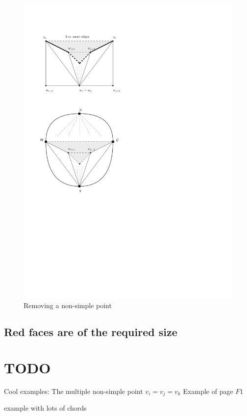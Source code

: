 \begin{figure}[h!]
\centering
\includegraphics[scale=1]{redAlgo/img/removeNonSimplePoint}

\caption{Removing a non-simple point 
    \label{fig:removeNonSimplePoint}}
\end{figure}

\subsection{Red faces are of the required size}


\section{TODO}
Cool examples: The multiple non-simple point $v_i = v_j =v_k$
Example of page $F1$

example with lots of chords
